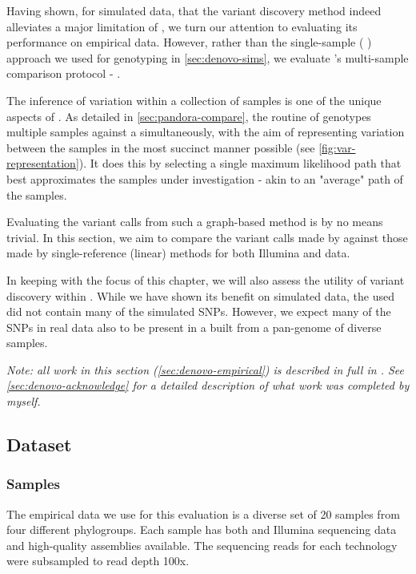 Having shown, for simulated data, that the \denovo{} variant discovery method indeed alleviates a major limitation of \pandora{}, we turn our attention to evaluating its performance on empirical data. However, rather than the single-sample (\pandora{} ) approach we used for genotyping in \autoref{sec:denovo-sims}, we evaluate \pandora{}'s multi-sample comparison protocol - \compare{}.

The inference of variation within a collection of samples is one of the unique aspects of \pandora{}. As detailed in \autoref{sec:pandora-compare}, the  routine of \pandora{} genotypes multiple samples against a \panrg{} simultaneously, with the aim of representing variation between the samples in the most succinct manner possible (see \autoref{fig:var-representation}). It does this by selecting a single maximum likelihood path that best approximates the samples under investigation - akin to an "average" path of the samples.

Evaluating the variant calls from such a graph-based method is by no means trivial. In this section, we aim to compare the variant calls made by \pandora{} against those made by single-reference (linear) methods for both Illumina and \ont{} data.

In keeping with the focus of this chapter, we will also assess the utility of \denovo{} variant discovery within \pandora{}. While we have shown its benefit on simulated data, the \panrg{} used did not contain many of the simulated SNPs. However, we expect many of the SNPs in real data also to be present in a \panrg{} built from a pan-genome of diverse samples. 

\textit{Note: all work in this section (\autoref{sec:denovo-empirical}) is described in full in \cite{pandora}. See \autoref{sec:denovo-acknowledge} for a detailed description of what work was completed by myself.}

\subsection{Dataset}
\label{sec:denovo-empirical-data}

\subsubsection{Samples}
The empirical data we use for this evaluation is a diverse set of 20 \ecoli{} samples from four different phylogroups. Each sample has both \ont{} and Illumina sequencing data and high-quality assemblies available. The sequencing reads for each technology were subsampled to read depth 100x.

